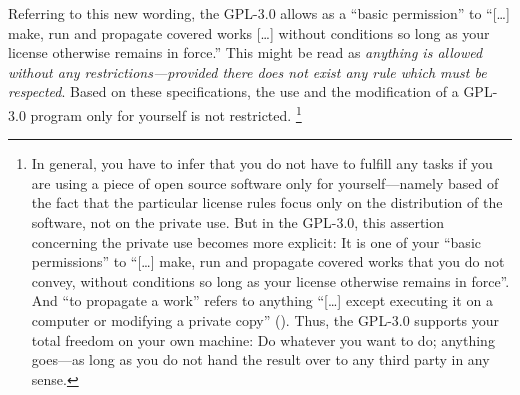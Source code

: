 Referring to this new wording, the GPL-3.0 allows as a \enquote{basic
permission} to \enquote{[\ldots] make, run and propagate covered works
[\ldots] without conditions so long as your license otherwise remains in
force.} This might be read as \emph{anything is allowed without
any restrictions---provided there does not exist any rule which must be
respected}. Based on these specifications, the use and the modification of a
GPL-3.0 program only for yourself is not restricted.%
  \footnote{In general, you have to infer that you do not have to fulfill any
  tasks if you are using a piece of open source software only for
  yourself---namely based of the fact that the particular license rules focus 
  only on the distribution of the software, not on the private use. But in the
  GPL-3.0, this assertion concerning the private use becomes more explicit: It is
  one of your \enquote{basic permissions} to \enquote{[\ldots] make, run and
  propagate covered works that you do not convey, without conditions so long as
  your license otherwise remains in force}. And \enquote{to propagate a work}
  refers to anything \enquote{[\ldots] except executing it on a computer or
  modifying a private copy} 
  (\cite[cf.][\nopage wp. §2 and §0]{Gpl30OsiLicense2007a}). 
  Thus, the GPL-3.0 supports your total freedom on your own machine: Do whatever
  you want to do; anything goes---as long as you do not hand the result over to
  any third party in any sense.}  

